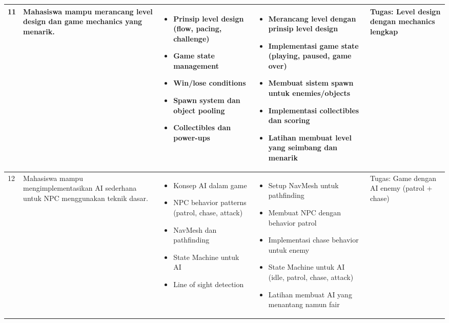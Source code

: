 \documentclass[a4paper,12pt]{article}
\begin{document}
\begin{longtable}{|p{0.8cm}|p{3.5cm}|p{4cm}|p{4cm}|p{2.5cm}|}
11 & Mahasiswa mampu merancang level design dan game mechanics yang menarik. & 
\begin{itemize}[leftmargin=*,nosep]
\item Prinsip level design (flow, pacing, challenge)
\item Game state management
\item Win/lose conditions
\item Spawn system dan object pooling
\item Collectibles dan power-ups
\end{itemize} & 
\begin{itemize}[leftmargin=*,nosep]
\item Merancang level dengan prinsip level design
\item Implementasi game state (playing, paused, game over)
\item Membuat sistem spawn untuk enemies/objects
\item Implementasi collectibles dan scoring
\item Latihan membuat level yang seimbang dan menarik
\end{itemize} & 
Tugas: Level design dengan mechanics lengkap \\
\hline

12 & Mahasiswa mampu mengimplementasikan AI sederhana untuk NPC menggunakan teknik dasar. & 
\begin{itemize}[leftmargin=*,nosep]
\item Konsep AI dalam game
\item NPC behavior patterns (patrol, chase, attack)
\item NavMesh dan pathfinding
\item State Machine untuk AI
\item Line of sight detection
\end{itemize} & 
\begin{itemize}[leftmargin=*,nosep]
\item Setup NavMesh untuk pathfinding
\item Membuat NPC dengan behavior patrol
\item Implementasi chase behavior untuk enemy
\item State Machine untuk AI (idle, patrol, chase, attack)
\item Latihan membuat AI yang menantang namun fair
\end{itemize} & 
Tugas: Game dengan AI enemy (patrol + chase) \\
\hline


\end{longtable}
\end{document}
